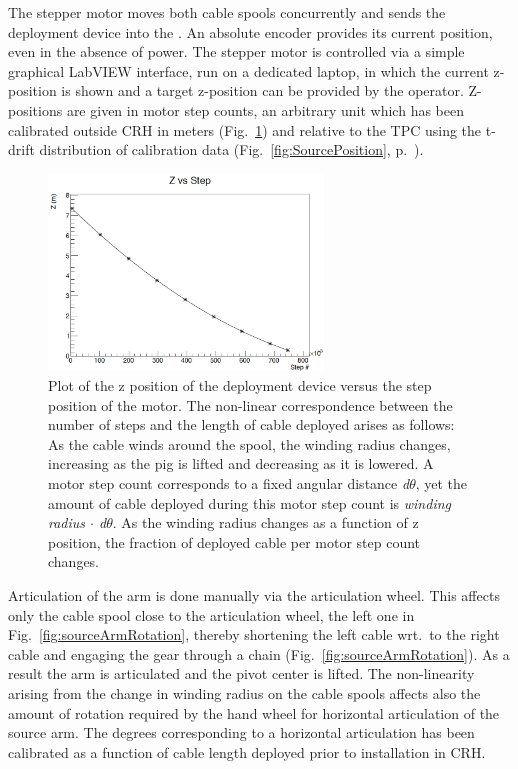 The stepper motor moves both cable spools concurrently and sends the deployment device into the \lsv. An absolute encoder provides its current position, even in the absence of power. The stepper motor is controlled via a simple graphical LabVIEW interface, run on a dedicated laptop, in which the current z-position is shown and a target z-position can be provided by the operator. Z-positions are given in motor step counts, an arbitrary unit which has been calibrated outside CRH in meters (Fig.~\ref{fig:z_test}) and relative to the TPC using the t-drift distribution of calibration data (Fig.~\ref{fig:SourcePosition}, p.~\pageref{fig:SourcePosition}).

\begin{figure}[htbp]
 \centering
 \includegraphics[width=0.65\textwidth]{Figures/Z_positioning_test}
 \caption{Plot of the z position of the deployment device versus the step position of the motor. The non-linear correspondence between the number of steps and the length of cable deployed arises as follows: As the cable winds around the spool, the winding radius changes, increasing as the pig is lifted and decreasing as it is lowered. A motor step count corresponds to a fixed angular distance \textit{d$\theta$}, yet the amount of cable deployed during this motor step count is \textit{winding radius $\cdot$ d$\theta$}. As the winding radius changes as a function of z position, the fraction of deployed cable per motor step count changes.}
 \label{fig:z_test}
\end{figure}

\label{sec:Nonlinearity:MotorStepCounts}
Articulation of the arm is done manually via the articulation wheel. This affects only the cable spool close to the articulation wheel, the left one in Fig.~\ref{fig:sourceArmRotation}, thereby shortening the left cable wrt.~to the right cable and engaging the gear through a chain (Fig.~\ref{fig:sourceArmRotation}). As a result the arm is articulated and the pivot center is lifted. The non-linearity arising from the change in winding radius on the cable spools affects also the amount of rotation required by the hand wheel for horizontal articulation of the source arm.
The degrees corresponding to a horizontal articulation has been calibrated as a function of cable length deployed prior to installation in CRH.

